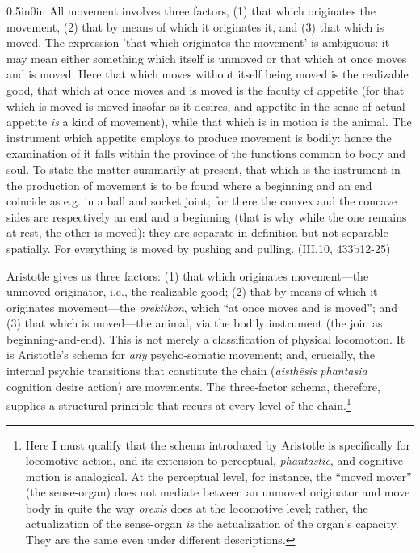 \begin{adjustwidth}{0.5in}{0in}
    All movement involves three factors, (1) that which originates the movement, (2) that by means of which it originates it, and (3) that which is moved. The expression 'that which originates the movement' is ambiguous: it may mean either something which itself is unmoved or that which at once moves and is moved. Here that which moves without itself being moved is the realizable good, that which at once moves and is moved is the faculty of appetite (for that which is moved is moved insofar as it desires, and appetite in the sense of actual appetite \textit{is} a kind of movement), while that which is in motion is the animal. The instrument which appetite employs to produce movement is bodily: hence the examination of it falls within the province of the functions common to body and soul. To state the matter summarily at present, that which is the instrument in the production of movement is to be found where a beginning and an end coincide as e.g. in a ball and socket joint; for there the convex and the concave sides are respectively an end and a beginning (that is why while the one remains at rest, the other is moved): they are separate in definition but not separable spatially. For everything is moved by pushing and pulling. (III.10, 433b12-25)
\end{adjustwidth}
Aristotle gives us three factors: (1) that which originates movement---the unmoved originator, i.e., the realizable good; (2) that by means of which it originates movement---the \textit{orektikon}, which ``at once moves and is moved''; and (3) that which is moved---the animal, via the bodily instrument (the join as beginning-and-end). This is not merely a classification of physical locomotion. It is Aristotle's schema for \textit{any} psycho-somatic movement; and, crucially, the internal psychic transitions that constitute the chain (\textit{aisthēsis} \ra \textit{phantasia} \ra cognition \ra desire \ra action) are movements. The three-factor schema, therefore, supplies a structural principle that recurs at every level of the chain.\footnote{Here I must qualify that the schema introduced by Aristotle is specifically for locomotive action, and its extension to perceptual, \textit{phantastic}, and cognitive motion is analogical. At the perceptual level, for instance, the ``moved mover'' (the sense-organ) does not mediate between an unmoved originator and move body in quite the way \textit{orexis} does at the locomotive level; rather, the actualization of the sense-organ \textit{is} the actualization of the organ's capacity. They are the same even under different descriptions.}

